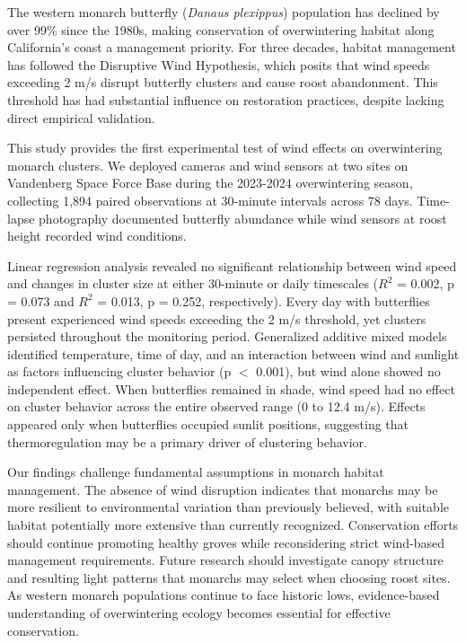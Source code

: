 The western monarch butterfly (\textit{Danaus plexippus}) population has declined by over 99\% since the 1980s, making conservation of overwintering habitat along California's coast a management priority. For three decades, habitat management has followed the Disruptive Wind Hypothesis, which posits that wind speeds exceeding 2 m/s disrupt butterfly clusters and cause roost abandonment. This threshold has had substantial influence on restoration practices, despite lacking direct empirical validation.

This study provides the first experimental test of wind effects on overwintering monarch clusters. We deployed cameras and wind sensors at two sites on Vandenberg Space Force Base during the 2023-2024 overwintering season, collecting 1,894 paired observations at 30-minute intervals across 78 days. Time-lapse photography documented butterfly abundance while wind sensors at roost height recorded wind conditions.

Linear regression analysis revealed no significant relationship between wind speed and changes in cluster size at either 30-minute or daily timescales ($R^2$ = 0.002, p = 0.073 and $R^2$ = 0.013, p = 0.252, respectively). Every day with butterflies present experienced wind speeds exceeding the 2 m/s threshold, yet clusters persisted throughout the monitoring period. Generalized additive mixed models identified temperature, time of day, and an interaction between wind and sunlight as factors influencing cluster behavior (p $<$ 0.001), but wind alone showed no independent effect. When butterflies remained in shade, wind speed had no effect on cluster behavior across the entire observed range (0 to 12.4 m/s). Effects appeared only when butterflies occupied sunlit positions, suggesting that thermoregulation may be a primary driver of clustering behavior.

Our findings challenge fundamental assumptions in monarch habitat management. The absence of wind disruption indicates that monarchs may be more resilient to environmental variation than previously believed, with suitable habitat potentially more extensive than currently recognized. Conservation efforts should continue promoting healthy groves while reconsidering strict wind-based management requirements. Future research should investigate canopy structure and resulting light patterns that monarchs may select when choosing roost sites. As western monarch populations continue to face historic lows, evidence-based understanding of overwintering ecology becomes essential for effective conservation.
